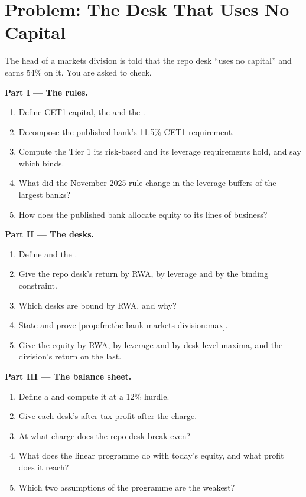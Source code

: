 \section{Problem: The Desk That Uses No Capital}

\begin{problem}\label{pb:fm:the-bank-markets-division:1}
The head of a markets division is told that the repo desk ``uses no capital'' and earns 54\% on it. You are asked to check.

\medskip\noindent\textbf{Part I --- The rules.}
\begin{enumerate}
\item Define CET1 capital, the  and the .
\item Decompose the published bank's 11.5\% CET1 requirement.
\item Compute the Tier 1 its risk-based and its leverage requirements hold, and say which binds.
\item What did the November 2025 rule change in the leverage buffers of the largest banks?
\item How does the published bank allocate equity to its lines of business?
\end{enumerate}

\medskip\noindent\textbf{Part II --- The desks.}
\begin{enumerate}[resume]
\item Define  and the .
\item Give the repo desk's return by RWA, by leverage and by the binding constraint.
\item Which desks are bound by RWA, and why?
\item State and prove \cref{prop:fm:the-bank-markets-division:max}.
\item Give the equity by RWA, by leverage and by desk-level maxima, and the division's return on the last.
\end{enumerate}

\medskip\noindent\textbf{Part III --- The balance sheet.}
\begin{enumerate}[resume]
\item Define a  and compute it at a 12\% hurdle.
\item Give each desk's after-tax profit after the charge.
\item At what charge does the repo desk break even?
\item What does the linear programme do with today's equity, and what profit does it reach?
\item Which two assumptions of the programme are the weakest?
\end{enumerate}


\end{problem}
